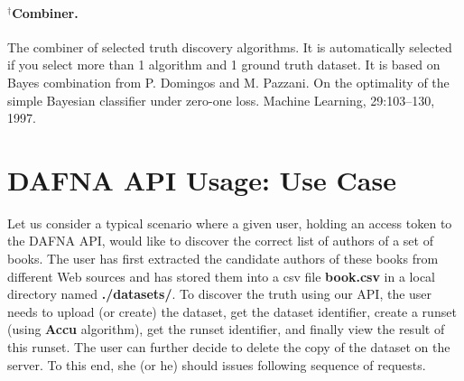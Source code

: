 \documentclass[a4paper,10pt]{scrartcl}
\begin{document}
\paragraph*{$^{\dagger}$Combiner.}
The combiner of selected truth discovery algorithms. It is automatically selected if you select more than 1 algorithm and 1 ground truth dataset. It is based on Bayes combination from P. Domingos and M. Pazzani. On the optimality of the simple Bayesian classifier under zero-one loss. Machine Learning, 29:103–130, 1997.
\section{DAFNA API Usage: Use Case}
Let us consider a typical scenario where a given user, holding an access token \textbf{} to the DAFNA API, would 
like to discover the correct list of authors of a set of books. The user has first extracted the candidate authors of
these books from different Web sources and has stored them into a csv file \textbf{book.csv} in a local directory named \textbf{./datasets/}.
To discover the truth using our API, the user needs to upload (or create) the dataset, get the dataset identifier, create a runset (using \textbf{Accu} algorithm),
get the runset identifier, and finally view the result of this runset. The user can further decide to delete the copy of the dataset on the server. To this end, 
she (or he) should issues following sequence of requests.
\end{document}
